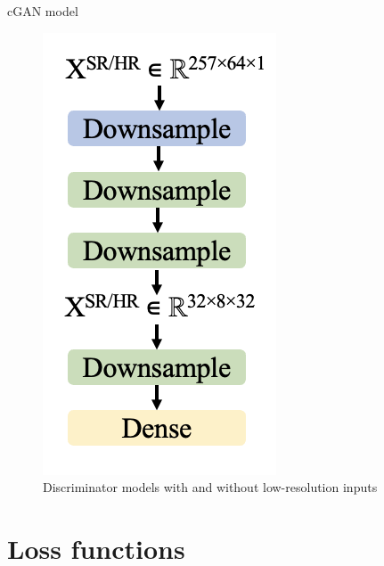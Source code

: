 \documentclass{beamer}
\newcounter{section}
\begin{document}
\begin{frame}[t]{cGAN model}
\begin{figure}
\begin{minipage}{0.49\textwidth}
            \includegraphics[height=1.0\textwidth]{MA_presentation/figures/discriminator_right.png}
        \end{minipage}
        \caption{Discriminator models with and without low-resolution inputs}
    \end{figure}

\end{frame}




\section{Loss functions}
\setcounter{section}{3}
\setcounter{figure}{0}

    
\end{document}
